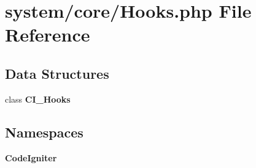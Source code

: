 \section{system/core/\-Hooks.php File Reference}
\label{system_2core_2hooks_8php}
\subsection*{Data Structures}
\begin{DoxyCompactItemize}
\item 
class {\bf C\-I\-\_\-\-Hooks}
\end{DoxyCompactItemize}
\subsection*{Namespaces}
\begin{DoxyCompactItemize}
\item 
{\bf Code\-Igniter}
\end{DoxyCompactItemize}
